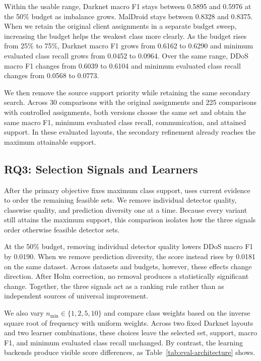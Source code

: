 Within the usable range, Darknet macro F1 stays between 0.5895 and 0.5976 at
the 50\% budget as imbalance grows. MalDroid stays between 0.8328 and 0.8375.
When we retain the original client assignments in a separate budget sweep,
increasing the budget helps the weakest class more clearly. As the budget rises from
25\% to 75\%, Darknet macro F1 grows from 0.6162 to 0.6290 and minimum
evaluated class recall grows from 0.0452 to 0.0964. Over the same range, DDoS
macro F1 changes from 0.6039 to 0.6104 and minimum evaluated class recall changes from
0.0568 to 0.0773.

We then remove the source support priority while retaining the same secondary
search. Across 30 comparisons with the original assignments and 225
comparisons with controlled assignments, both versions choose the same set
and obtain the same macro F1, minimum evaluated class recall, communication,
and attained support. In these evaluated layouts, the secondary refinement
already reaches the maximum attainable support.

\subsection{RQ3: Selection Signals and Learners}

After the primary objective fixes maximum class support, \Fname uses current
evidence to order the remaining feasible sets. We remove individual detector
quality, classwise quality, and prediction diversity one at a time.
Because every variant still attains the maximum support, this comparison
isolates how the three signals order otherwise feasible detector sets.

At the 50\% budget, removing individual detector quality lowers DDoS macro F1
by 0.0190. When we remove prediction diversity, the score instead rises by
0.0181 on the same dataset. Across datasets and budgets, however, these effects
change direction. After Holm correction, no removal produces a statistically
significant change. Together, the three signals act as a ranking rule rather
than as independent sources of universal improvement.

We also vary $n_{\min}\in\{1,2,5,10\}$ and compare class weights based on the
inverse square root of frequency with uniform weights. Across two fixed
Darknet layouts and two learner combinations, these choices leave the
selected set, support, macro F1, and minimum evaluated class recall unchanged.
By contrast, the learning backends produce visible score differences, as
Table~\ref{tab:eval-architecture} shows.

